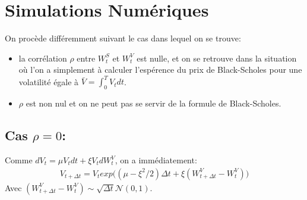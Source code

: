 \documentclass{report}
\begin{document}
\newpage



\section*{Simulations Numériques}
On procède différemment suivant le cas dans lequel on se trouve:
\begin{itemize}
	\item la corrélation $\rho$ entre $W_t^S$ et $W_t^V$ est nulle, et on se retrouve dans la situation où l'on a simplement à calculer l'espérence du prix de Black-Scholes pour une volatilité égale à $\bar{V} = \int_0^T{V_t dt}$.
	\item $\rho$ est non nul et on ne peut pas se servir de la formule de Black-Scholes.
\end{itemize}
\subsection*{Cas $\rho=0$:}
Comme $dV_t = \mu V_t dt + \xi V_t dW^V_t$, on a immédiatement:
\begin{eqnarray*}
V_{t + \Delta t} = V_t exp\big((\mu - \xi^2/2)\Delta t + \xi (W^V_{t+\Delta t} - W^V_t)\big)
\end{eqnarray*}
Avec $(W^V_{t + \Delta t} - W^V_t) \sim \sqrt{\Delta t}\mathcal{N}(0, 1)$.\\
\end{document}
